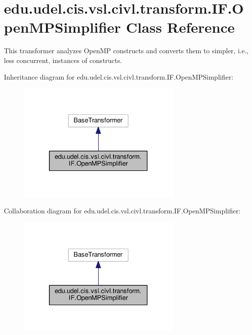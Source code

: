 \hypertarget{classedu_1_1udel_1_1cis_1_1vsl_1_1civl_1_1transform_1_1IF_1_1OpenMPSimplifier}{}\section{edu.\+udel.\+cis.\+vsl.\+civl.\+transform.\+I\+F.\+Open\+M\+P\+Simplifier Class Reference}
\label{classedu_1_1udel_1_1cis_1_1vsl_1_1civl_1_1transform_1_1IF_1_1OpenMPSimplifier}


This transformer analyzes Open\+M\+P constructs and converts them to simpler, i.\+e., less concurrent, instances of constructs.  




Inheritance diagram for edu.\+udel.\+cis.\+vsl.\+civl.\+transform.\+I\+F.\+Open\+M\+P\+Simplifier\+:
\nopagebreak
\begin{figure}[H]
\begin{center}
\leavevmode
\includegraphics[width=230pt]{classedu_1_1udel_1_1cis_1_1vsl_1_1civl_1_1transform_1_1IF_1_1OpenMPSimplifier__inherit__graph}
\end{center}
\end{figure}


Collaboration diagram for edu.\+udel.\+cis.\+vsl.\+civl.\+transform.\+I\+F.\+Open\+M\+P\+Simplifier\+:
\nopagebreak
\begin{figure}[H]
\begin{center}
\leavevmode
\includegraphics[width=230pt]{classedu_1_1udel_1_1cis_1_1vsl_1_1civl_1_1transform_1_1IF_1_1OpenMPSimplifier__coll__graph}
\end{center}
\end{figure}
